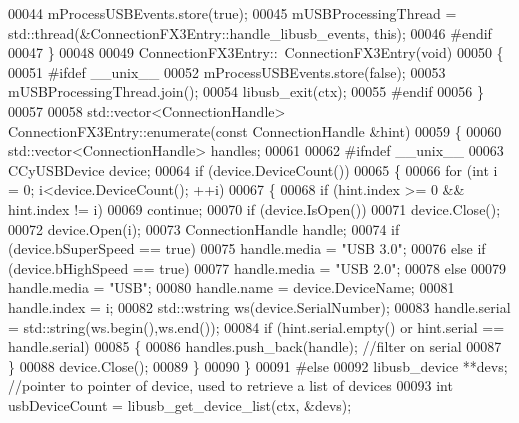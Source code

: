 \begin{DoxyCode}
{{00044     mProcessUSBEvents.store(\textcolor{keyword}{true});
00045     mUSBProcessingThread = std::thread(&ConnectionFX3Entry::handle\_libusb\_events, \textcolor{keyword}{this});
00046 \textcolor{preprocessor}{#endif}
00047 \}
00048 
00049 ConnectionFX3Entry::~ConnectionFX3Entry(\textcolor{keywordtype}{void})
00050 \{
00051 \textcolor{preprocessor}{#ifdef \_\_unix\_\_}
00052     mProcessUSBEvents.store(\textcolor{keyword}{false});
00053     mUSBProcessingThread.join();
00054     libusb\_exit(ctx);
00055 \textcolor{preprocessor}{#endif}
00056 \}
00057 
00058 std::vector<ConnectionHandle> ConnectionFX3Entry::enumerate(\textcolor{keyword}{const} 
      ConnectionHandle &hint)
00059 \{
00060     std::vector<ConnectionHandle> handles;
00061 
00062 \textcolor{preprocessor}{#ifndef \_\_unix\_\_}
00063     CCyUSBDevice device;
00064     \textcolor{keywordflow}{if} (device.DeviceCount())
00065     \{
00066         \textcolor{keywordflow}{for} (\textcolor{keywordtype}{int} i = 0; i<device.DeviceCount(); ++i)
00067         \{
00068             \textcolor{keywordflow}{if} (hint.index >= 0 && hint.index != i)
00069                 \textcolor{keywordflow}{continue};
00070             \textcolor{keywordflow}{if} (device.IsOpen())
00071                 device.Close();
00072             device.Open(i);
00073             ConnectionHandle handle;
00074             \textcolor{keywordflow}{if} (device.bSuperSpeed == \textcolor{keyword}{true})
00075                 handle.media = \textcolor{stringliteral}{"USB 3.0"};
00076             \textcolor{keywordflow}{else} \textcolor{keywordflow}{if} (device.bHighSpeed == \textcolor{keyword}{true})
00077                 handle.media = \textcolor{stringliteral}{"USB 2.0"};
00078             \textcolor{keywordflow}{else}
00079                 handle.media = \textcolor{stringliteral}{"USB"};
00080             handle.name = device.DeviceName;
00081             handle.index = i;
00082             std::wstring ws(device.SerialNumber);
00083             handle.serial = std::string(ws.begin(),ws.end());
00084             \textcolor{keywordflow}{if} (hint.serial.empty() or hint.serial == handle.serial)
00085             \{
00086                 handles.push\_back(handle); \textcolor{comment}{//filter on serial}
00087             \}
00088             device.Close();
00089         \}
00090     \}
00091 \textcolor{preprocessor}{#else}
00092     libusb\_device **devs; \textcolor{comment}{//pointer to pointer of device, used to retrieve a list of devices}
00093     \textcolor{keywordtype}{int} usbDeviceCount = libusb\_get\_device\_list(ctx, &devs);
}}
\end{DoxyCode}
